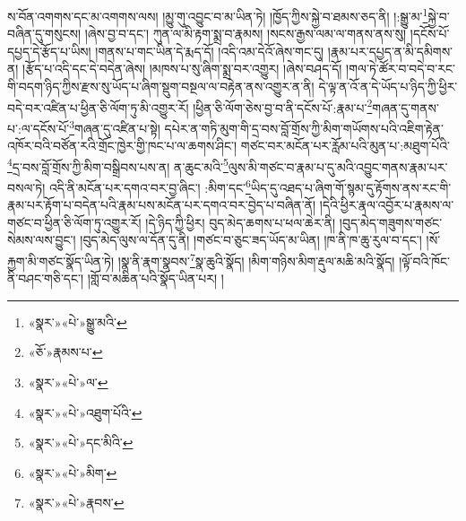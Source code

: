 ས་བོན་འགགས་དང་མ་འགགས་ལས། །མྱུ་གུ་འབྱུང་བ་མ་ཡིན་ཏེ། །ཁྱོད་ཀྱིས་སྐྱེ་བ་ཐམས་ཅད་ནི། །:སྒྱུ་མ་\footnote{«སྣར་»«པེ་»སྒྱུ་མའི་}སྐྱེ་བ་བཞིན་དུ་གསུངས། །ཞེས་བྱ་བ་དང་། ཀུན་ལ་མི་རྟག་སྨྲ་བ་རྣམས། །སངས་རྒྱས་ལམ་ལ་གནས་ནས་སུ། །དངོས་པོ་དཔྱད་དེ་རྩོད་པ་ཡིས། །གནས་པ་གང་ཡིན་དེ་རྨད་དོ། །འདི་འམ་དེའོ་ཞེས་གང་དུ། །རྣམ་པར་དཔྱད་ན་མི་དམིགས་ན། །རྩོད་པ་འདི་དང་དེ་བདེན་ཞེས། །མཁས་པ་སུ་ཞིག་སྨྲ་བར་འགྱུར། །ཞེས་བཤད་དོ། །གལ་ཏེ་ཚོར་བ་བདེ་བ་རང་གི་བདག་ཉིད་ཀྱིས་རྫས་སུ་ཡོད་པ་ཞིག་སྡུག་བསྔལ་ལ་བརྟེན་ནས་འགྱུར་ན་ནི། དེ་ལྟ་ན་འོ་ན་དེ་ཡོད་པ་ཉིད་ཀྱི་ཕྱིར་བདེ་བར་འཛིན་པ་ཕྱིན་ཅི་ལོག་ཏུ་མི་འགྱུར་རོ། །ཕྱིན་ཅི་ལོག་ཅེས་བྱ་བ་ནི་དངོས་པོ་:རྣམ་པ་\footnote{«ཅོ་»རྣམས་པ་}གཞན་དུ་གནས་པ་:ལ་དངོས་པོ་\footnote{«སྣར་»«པེ་»ལ་}གཞན་དུ་འཛིན་པ་སྟེ། དཔེར་ན་གཏི་མུག་གི་དྲ་བས་བློ་གྲོས་ཀྱི་མིག་གཡོགས་པའི་འཇིག་རྟེན་འཁོར་བའི་བཙོན་རའི་གྲོང་ཁྱེར་གྱི་ཁང་པ་ལ་ཆགས་ཤིང་། གཙང་བར་མངོན་པར་རློམ་པའི་མུན་པ་:མཐུག་པོའི་\footnote{«སྣར་»«པེ་»འཐུག་པོའི་}དྲ་བས་བློ་གྲོས་ཀྱི་མིག་བསྒྲིབས་པས་ན། ན་ཆུང་མའི་\footnote{«སྣར་»«པེ་»དང་མིའི་}ལུས་མི་གཙང་བ་རྣམ་པ་དུ་མའི་འབྱུང་གནས་རྣམ་པར་བསལ་ཏེ། འདི་ནི་མངོན་པར་དགའ་བར་བྱ་ཞིང་། :མིག་དང་\footnote{«སྣར་»«པེ་»མིག་}ཡིད་དུ་འཐད་པ་ཞིག་གོ་སྙམ་དུ་རྟོགས་ནས་རང་གི་རྣམ་པར་རྟོག་པ་བདེན་པའི་རྣམ་པས་མངོན་པར་དགའ་བར་བྱེད་པ་བཞིན་ནོ། །དེའི་ཕྱིར་རྣལ་འབྱོར་པ་རྣམས་ལ་གཙང་བ་ཕྱིན་ཅི་ལོག་ཏུ་འགྱུར་རོ། །དེ་ཉིད་ཀྱི་ཕྱིར། བུད་མེད་ཆགས་པ་ཕལ་ཆེར་ནི། །བུད་མེད་གཟུགས་གཙང་སེམས་ལས་བྱུང་། །བུད་མེད་ལུས་ལ་དོན་དུ་ནི། །གཙང་བ་ཅུང་ཟད་ཡོད་མ་ཡིན། །ཁ་ནི་ཁ་ཆུ་རུལ་བ་དང་། །སོ་རྐྱག་མི་གཙང་སྣོད་ཡིན་ཏེ། །སྣ་ནི་རྣག་སྣབས་\footnote{«སྣར་»«པེ་»རྣབས་}སྣ་ཆུའི་སྣོད། །མིག་གཉིས་མིག་རྡུལ་མཆི་མའི་སྣོད། །ལྟོ་བའི་ཁོང་ནི་བཤང་གཅི་དང་། །གློ་བ་མཆིན་པའི་སྣོད་ཡིན་པར། །
